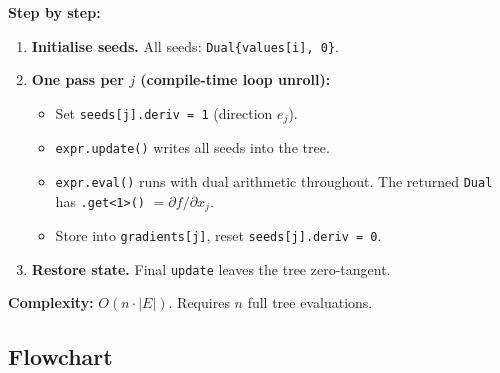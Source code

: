 \documentclass[11pt,a4paper]{article}
\newcommand{\code}[1]{\texttt{#1}}
\begin{document}
\medskip\noindent\textbf{Step by step:}
\begin{enumerate}
  \item \textbf{Initialise seeds.}  All seeds: \code{Dual\{values[i], 0\}}.
  \item \textbf{One pass per $j$ (compile-time loop unroll):}
    \begin{itemize}
      \item Set \code{seeds[j].deriv = 1} (direction $e_j$).
      \item \code{expr.update()} writes all seeds into the tree.
      \item \code{expr.eval()} runs with dual arithmetic throughout.
        The returned \code{Dual} has \code{.get<1>()} $= \partial f/\partial x_j$.
      \item Store into \code{gradients[j]}, reset \code{seeds[j].deriv = 0}.
    \end{itemize}
  \item \textbf{Restore state.}  Final \code{update} leaves the tree
        zero-tangent.
\end{enumerate}

\textbf{Complexity:} $O(n \cdot |E|)$.  Requires $n$ full tree evaluations.

\subsection{Flowchart}
\end{document}
